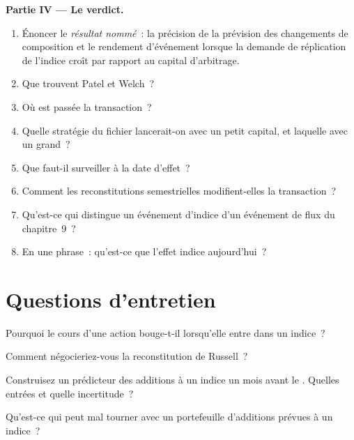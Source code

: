 \begin{problem}
\medskip\noindent\textbf{Partie IV --- Le verdict.}
\begin{enumerate}[resume]
\item Énoncer le \emph{résultat nommé}~: la précision de la prévision des changements de composition et le rendement d'événement lorsque la demande de réplication de l'indice croît par rapport au
capital d'arbitrage.
\item Que trouvent Patel et Welch~?
\item Où est passée la transaction~?
\item Quelle stratégie du fichier lancerait-on avec un petit capital, et laquelle avec un grand~?
\item Que faut-il surveiller à la date d'effet~?
\item Comment les reconstitutions semestrielles modifient-elles la transaction~?
\item Qu'est-ce qui distingue un événement d'indice d'un événement de flux du chapitre~9~?
\item En une phrase~: qu'est-ce que l'effet indice aujourd'hui~?
\end{enumerate}
\end{problem}

\section{Questions d'entretien}

\begin{interviewq}\label{iq:s1:index-rebalancing:1}
Pourquoi le cours d'une action bouge-t-il lorsqu'elle entre dans un indice~?
\end{interviewq}

\begin{interviewq}\label{iq:s1:index-rebalancing:2}
Comment négocieriez-vous la reconstitution de Russell~?
\end{interviewq}

\begin{interviewq}\label{iq:s1:index-rebalancing:3}
Construisez un prédicteur des additions à un indice un mois avant le . Quelles entrées et quelle incertitude~?
\end{interviewq}

\begin{interviewq}\label{iq:s1:index-rebalancing:4}
Qu'est-ce qui peut mal tourner avec un portefeuille d'additions prévues à un indice~?
\end{interviewq}

